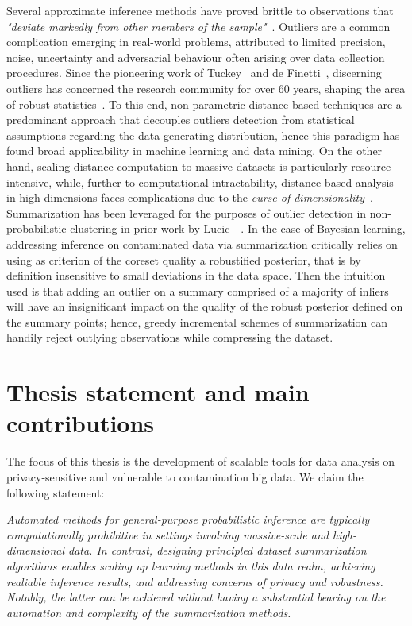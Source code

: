  Several approximate inference methods have proved brittle to observations that \emph{"deviate markedly from other members of the sample"}~\citep{grubbs69}. Outliers are a common complication emerging in real-world problems, attributed to limited precision, noise, uncertainty and adversarial behaviour often arising over data collection procedures. Since the pioneering work of Tuckey~\citep{tukey60} and de Finetti~\citep{definetti61}, discerning outliers has concerned the research community for over 60 years, shaping the area of robust statistics~\citep{huber09}. To this end, non-parametric distance-based techniques are a predominant approach that decouples outliers detection from statistical assumptions regarding the data generating distribution, hence this paradigm has found broad applicability in machine learning and data mining. On the other hand, scaling distance computation to massive datasets is particularly resource intensive, while, further to computational intractability, distance-based analysis in high dimensions faces complications due to the \emph{curse of dimensionality}~\citep{vershynin18,wainwright19}. Summarization has been leveraged for the purposes of outlier detection in non-probabilistic clustering in prior work by Lucic~\etal~\citep{lucic16outliers}. In the case of Bayesian learning, addressing inference on contaminated data via summarization critically relies on using as criterion of the coreset quality a robustified posterior, that is by definition insensitive to small deviations in the data space. Then the intuition used is that adding an outlier on a summary comprised of a majority of inliers will have an insignificant impact on the quality of the robust posterior defined on the summary points; hence, greedy incremental schemes of summarization can handily reject outlying observations while compressing the dataset.

\section{Thesis statement and main contributions}
\label{sec:thesis-goals}

The focus of this thesis is the development of scalable tools for data analysis on privacy-sensitive and vulnerable to contamination big data. We claim the following statement:

\emph{Automated methods for general-purpose probabilistic inference are typically computationally prohibitive in settings involving massive-scale and high-dimensional data. In contrast, designing principled dataset summarization algorithms enables scaling up learning methods in this data realm, achieving realiable inference results, and addressing concerns of privacy and robustness. Notably, the latter can be achieved without having a substantial bearing on the automation and complexity of the summarization methods.}

